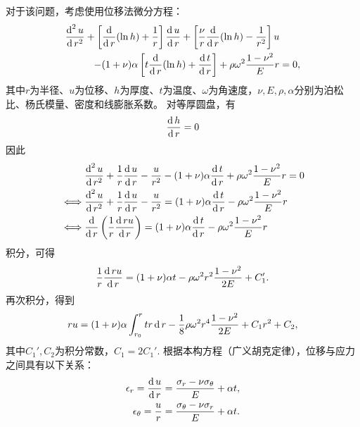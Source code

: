 对于该问题，考虑使用位移法微分方程：
\begin{equation}
    \begin{aligned}
        \frac{\dif^2 u}{\dif r^2} + \left[ \frac{\dif}{\dif r} (\ln h )+ \frac{1}{r} \right] \frac{\dif u}{\dif r} + 
        \left[\frac{\nu}{r}\frac{\dif}{\dif r} (\ln h) - \frac{1}{r^2}\right] u & \\ 
        - (1 + \nu) \alpha \left[ t \frac{\dif}{\dif r} (\ln h) + \frac{\dif t}{\dif r}\right] +
        \rho \omega^2 \frac{1 - \nu^2}{E} r &= 0,
    \end{aligned}
\end{equation}
其中$r$为半径、$u$为位移、$h$为厚度、$t$为温度、$\omega$为角速度，$\nu, E, \rho, \alpha$分别为泊松比、杨氏模量、密度和线膨胀系数。
对等厚圆盘，有
\begin{equation}
    \frac{\operatorname{\mathop{} \! \mathrm{d}} h}{\operatorname{\mathop{} \! \mathrm{d}} r} = 0
\end{equation}
因此
\begin{equation}
    \begin{aligned}
        & \frac{\dif^2 u}{\dif r^2} + \frac{1}{r} \frac{\dif u}{\dif r} - \frac{u}{r^2} - (1 + \nu) \alpha \frac{\dif t}{\dif r} + \rho \omega^2 \frac{1 - \nu^2}{E} r = 0 \\
        \iff & \frac{\dif^2 u}{\dif r^2} + \frac{1}{r} \frac{\dif u}{\dif r} - \frac{u}{r^2} = (1 + \nu) \alpha \frac{\dif t}{\dif r} - \rho \omega^2 \frac{1 - \nu^2}{E} r \\
        \iff & \frac{\dif}{\dif r}\left( \frac{1}{r} \frac{\dif ru}{\dif r} \right) = (1 + \nu) \alpha \frac{\dif t}{\dif r} - \rho \omega^2 \frac{1 - \nu^2}{E} r
    \end{aligned}
\end{equation}
积分，可得
\begin{equation}
    \frac{1}{r} \frac{\operatorname{\mathop{} \! \mathrm{d}} ru}{\operatorname{\mathop{} \! \mathrm{d}} r} = (1 + \nu) \alpha t- \rho \omega^2 r^2 \frac{1 - \nu^2}{2E} + C_1'.
\end{equation}
再次积分，得到
\begin{equation}
    ru = (1 + \nu) \alpha \int_{r_0}^r tr \operatorname{\mathop{} \! \mathrm{d}} r - \frac{1}{8} \rho \omega^2 r^4 \frac{1 - \nu^2}{2E} + C_1 r^2 + C_2,
\end{equation}
其中$C_1', C_2$为积分常数，$C_1 = 2C_1'$.
根据本构方程（广义胡克定律），位移与应力之间具有以下关系：
\begin{equation}
    \begin{aligned}
        \epsilon_r = \frac{\operatorname{\mathop{} \! \mathrm{d}} u}{\operatorname{\mathop{} \! \mathrm{d}} r} &= \frac{\sigma_r - \nu \sigma_\theta}{E} + \alpha t, \\
        \epsilon_\theta = \frac{u}{r} &= \frac{\sigma_\theta - \nu \sigma_r}{E} + \alpha t.
    \end{aligned}
\end{equation}

